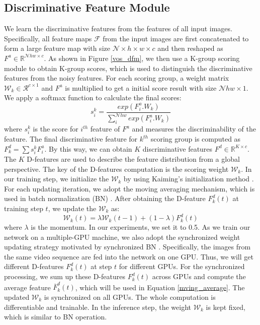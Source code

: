\documentclass[runningheads]{llncs}
\begin{document}
\subsection{Discriminative Feature Module}\label{sec_dfm}
We learn the discriminative features from the features of all input images. Specifically, all feature maps $\mathcal{F}$ from the input images are first concatenated to form a large feature map with size $\mathcal{N} \times h \times w \times c$ and then reshaped as $F^{a} \in \mathbb{R}^{\mathcal{N}hw \times c}$. As shown in Figure \ref{vos_dfm}, we then use a K-group scoring module to obtain K-group scores, which is used to distinguish the discriminative features from the noisy features. For each scoring group,   a  weight matrix $\mathcal{W}_k \in \mathcal{R}^{c \times 1}$  and $F^{a}$ is multiplied to get a initial score result with size $\mathcal{N}hw \times 1$.  We apply a softmax function to calculate the final scores:
\begin{equation}
s_i^{k} = \frac{exp (F^{a}_{i} . W_k)}{\sum_{i}^{\mathcal{N}hw} exp(F^a_{i} . W_k)}
\end{equation}
where $s_i^{k}$ is the score for $i^{th}$ feature of $F^a$ and  measures the discriminability of the feature. The final discriminative feature for $k^{th}$ scoring group is computed as $	F_{k}^{d} = \sum s_i^{k}F^{a}_{i}$. By this way, we can obtain $K$ discriminative features $F^{d} \in \mathbb{R}^{K \times c}$.\\
\indent The $K$ D-features are used to describe the feature distribution from a global perspective. The key of the  D-features computation is the  scoring weight $\mathcal{W}_k$. In our training step, we initialize the $\mathcal{W}_k$ by using Kaiming’s initialization method \cite{kaiming_initialization}.  For each updating iteration, we adopt the  moving averaging mechanism, which is used in  batch normalization (BN) \cite{batch_normalization}. After obtaining the D-feature $F_k^{d}(t)$ at training step $t$, we update the $\mathcal{W}_k$ as:
\begin{equation}
\mathcal{W}_k(t) = \lambda \mathcal{W}_k(t - 1) + (1 - \lambda) F_k^{d}(t)\label{mving_average}
\end{equation}
where $\lambda$ is the momentum. In our experiments, we set it to 0.5. As we train our network on a multiple-GPU machine, we also adopt the synchronized weight updating strategy motivated by synchronized BN \cite{inplaceabn}. Specifically, the images from the same video sequence are fed into the network on one GPU. Thus, we will get different D-features $F_k^{d}(t)$ at step $t$ for different GPUs. For the synchronized processing, we sum up these D-features $F_k^{d}(t)$ across GPUs and compute the average feature $\overline{F}_k^{d}(t)$, which will be used in Equation \ref{mving_average}.  The updated $\mathcal{W}_k$ is synchronized on all GPUs. The whole computation is differentiable and trainable. In the inference step, the weight $\mathcal{W}_k$ is kept fixed, which is similar to BN operation.
\end{document}
